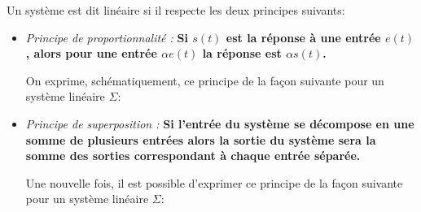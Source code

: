 Un système est dit linéaire si il respecte les deux principes suivants:

\begin{itemize}
    \item \emph{Principe de proportionnalité :}
          \textbf{Si $s(t)$ est la réponse à une entrée $e(t)$, alors 
          pour une entrée $\alpha e(t)$ la réponse est $\alpha s(t)$.}
        
    On exprime, schématiquement, ce principe de la façon suivante pour 
    un système linéaire $\Sigma$:
    \begin{center}
    {\tikzset{external/export=false}
    }
    \end{center}


    \item \emph{Principe de superposition :}
     \textbf{Si l'entrée du système se décompose en une somme 
        de plusieurs entrées alors la sortie du système sera la somme des 
        sorties correspondant à chaque entrée séparée.}

    Une nouvelle fois, il est possible d'exprimer ce principe de la façon 
    suivante pour un système linéaire $\Sigma$:
    \begin{center}
    
    \end{center}


\end{itemize}
